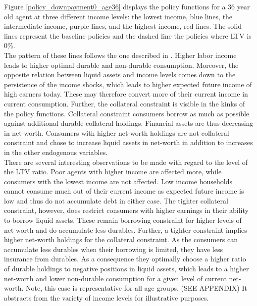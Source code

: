 \documentclass[12pt,a4paper,leqno]{article}
\theoremstyle{definition}
\begin{document}
Figure \ref{policy_downpayment0_age36} displays the policy functions for a 36 year old agent at three different income levels: the lowest income, blue lines, the intermediate income, purple lines, and the highest income, red lines. The solid lines represent the baseline policies and the dashed line the policies where LTV is 0\%.\\ 
The pattern of these lines follows the one described in \cite{hintermaier2010}. Higher labor income leads to higher optimal durable and non-durable consumption. Moreover, the opposite   relation between liquid assets and income levels comes down to the persistence of the income shocks, which leads to higher expected future income of high earners today. These may therefore convert more of their current income in current consumption. Further, the collateral constraint is visible in the kinks of the policy functions. Collateral constraint consumers borrow as much as possible against additional durable collateral holdings. Financial assets are thus decreasing in net-worth. Consumers with higher net-worth holdings are not collateral constraint and chose to increase liquid assets in net-worth in addition to increases in the other endogenous variables. \\
There are several interesting observations to be made with regard to the level of the LTV ratio. Poor agents with higher income are affected more, while consumers with the lowest income are not affected.
Low income households cannot consume much out of their current income as expected future income is low and thus do not accumulate debt in either case. The tighter collateral constraint, however, does restrict consumers with higher earnings in their ability to borrow liquid assets. These remain borrowing constraint for higher levels of net-worth and do accumulate less durables. Further, a tighter constraint implies higher net-worth holdings for the collateral constraint. As the consumers can accumulate less durables when their borrowing is limited, they have less insurance from durables. As a consequence they optimally choose a higher ratio of durable holdings to negative positions in liquid assets, which leads to a higher net-worth and lower non-durable consumption for a given level of current net-worth.
Note, this case is representative for all age groups. (SEE APPENDIX) It abstracts from the variety of income levels for illustrative purposes.
\end{document}
